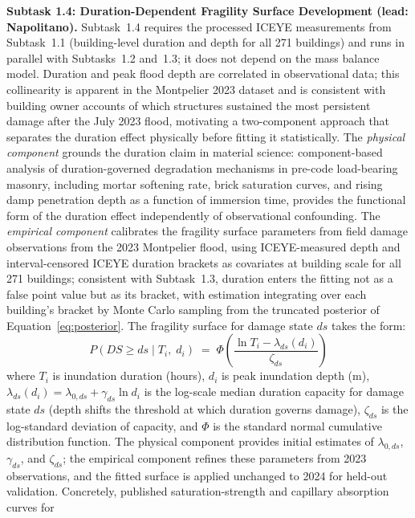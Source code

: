 \documentclass[11pt]{article}
\begin{document}
\textbf{Subtask 1.4: Duration-Dependent Fragility Surface Development
(lead: Napolitano).}
Subtask~1.4 requires the processed ICEYE measurements from Subtask~1.1 (building-level
duration and depth for all 271 buildings) and runs in parallel with Subtasks~1.2
and~1.3; it does not depend on the mass balance model.
Duration and peak flood depth are correlated in observational data; this
collinearity is apparent in the Montpelier 2023 dataset and is consistent with
building owner accounts of which structures sustained the most persistent damage
after the July 2023 flood, motivating a two-component approach that separates
the duration effect physically before fitting it statistically.
The \textit{physical component} grounds the duration claim in material science:
component-based analysis of duration-governed degradation mechanisms in pre-code
load-bearing masonry, including mortar softening rate, brick saturation curves,
and rising damp penetration depth as a function of immersion time, provides the
functional form of the duration effect independently of observational confounding.
The \textit{empirical component} calibrates the fragility surface parameters from
field damage observations from the 2023 Montpelier flood, using ICEYE-measured
depth and interval-censored ICEYE duration brackets as covariates at building
scale for all 271 buildings; consistent with Subtask~1.3, duration enters the
fitting not as a false point value but as its bracket, with estimation integrating
over each building's bracket by Monte Carlo sampling from the truncated posterior
of Equation~\eqref{eq:posterior}.
The fragility surface for damage state $ds$ takes the form:
\begin{equation}\label{eq:fragility}
  P(DS \geq ds \mid T_i,\; d_i) \;=\; \Phi\!\left(
    \frac{\ln T_i - \lambda_{ds}(d_i)}{\zeta_{ds}}\right)
\end{equation}
where $T_i$ is inundation duration (hours), $d_i$ is peak inundation depth (m),
$\lambda_{ds}(d_i) = \lambda_{0,ds} + \gamma_{ds} \ln d_i$ is the log-scale median
duration capacity for damage state $ds$ (depth shifts the threshold at which
duration governs damage), $\zeta_{ds}$
is the log-standard deviation of capacity, and $\Phi$ is the standard normal
cumulative distribution function.
The physical component provides initial estimates of $\lambda_{0,ds}$,
$\gamma_{ds}$, and
$\zeta_{ds}$; the empirical component refines these parameters from 2023 observations,
and the fitted surface is applied unchanged to 2024 for held-out validation.
Concretely, published saturation-strength and capillary absorption curves for
\end{document}
